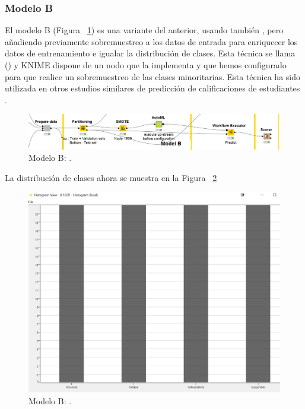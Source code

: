 \subsubsection{Modelo B}

El modelo B (Figura ~\ref{fig:workflowB1}) es una variante del anterior, usando también , pero añadiendo previamente sobremuestreo a los datos 
de entrada para enriquecer los datos de entrenamiento e igualar la distribución de clases. Esta técnica se llama 
 \cite{smote} () y KNIME dispone de un nodo que la implementa y que hemos 
configurado para que realice un sobremuestreo de las clases minoritarias. Esta técnica ha sido utilizada en otros estudios similares de 
predicción de calificaciones de estudiantes \cite{multiclass-pred}. 

\begin{figure}[!htb]
	\centering
	\includegraphics[width=1\textwidth]{img/workflowB1.png}
	\caption{Modelo B: .}
	\label{fig:workflowB1}
\end{figure}
\FloatBarrier

La distribución de clases ahora se muestra en la Figura ~\ref{fig:workflowB2}

\begin{figure}[!htb]
	\centering
	\includegraphics[width=1\textwidth]{img/workflowB2.png}
	\caption{Modelo B: .}
	\label{fig:workflowB2}
\end{figure}
\FloatBarrier

